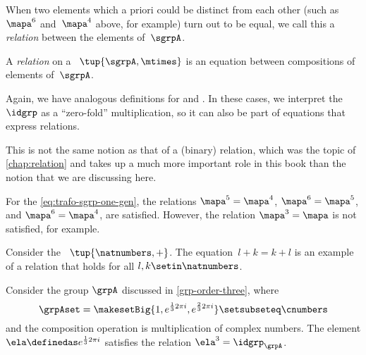 When two elements which a priori could be distinct from each other (such as~$\mapa^6$ and~$\mapa^4$ above, for example) turn out to be equal, we call this a \emph{relation} between the elements of~$\sgrpA$.

\begin{ctdefinition}\label{def:relation-on-semigroup}
    A \emph{relation} on a ~$\tup{\sgrpA, \mtimes}$ is an equation between compositions of elements of~$\sgrpA$.
\end{ctdefinition}

\begin{remark}
    Again, we have analogous definitions for  and .
    In these cases, we interpret the  $\idgrp$ as a ``zero-fold'' multiplication, so it can also be part of equations that express relations.
\end{remark}

\begin{remark}
    This is not the same notion as that of a (binary) relation, which was the topic of \cref{chap:relation} and takes up a much more important role in this book than the notion that we are discussing here.
\end{remark}

\begin{example}
    For the  \cref{eq:trafo-sgrp-one-gen}, the relations $\mapa^5 = \mapa^4$, $\mapa^6 = \mapa^5$, and $\mapa^6 = \mapa^4$, \etc are satisfied.
    However, the relation $\mapa^3 = \mapa$ is not satisfied, for example.

\end{example}

\begin{example}
    Consider the ~$\tup{\natnumbers, +}$.
    The equation~$l + k = k + l$ is an example of a relation that holds for all $l, k \setin \natnumbers$.
\end{example}

\begin{example}
    Consider the group $\grpA$ discussed in \cref{grp-order-three}, where
    \begin{equation}
        \grpAset = \makesetBig{ 1, e^{\frac{1}{3}2\pi i}, e^{\frac{2 }{3}2\pi i} } \setsubseteq \cnumbers
    \end{equation}
    and the composition operation is multiplication of complex numbers.
    The element $\ela \definedas e^{\frac{1}{3}2\pi i}$ satisfies the relation $\ela^3 = \idgrp_\grpA$.
\end{example}


